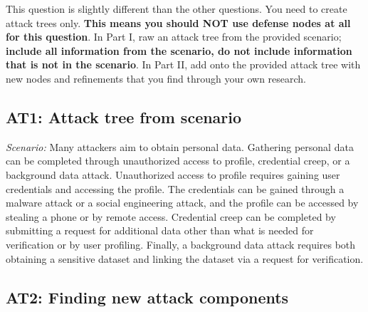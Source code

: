 

This question is slightly different than the other questions. You need to create attack trees only. \textbf{This means you should NOT use defense nodes at all for this question}. In Part I, raw an attack tree from the provided scenario; \textbf{include all information from the scenario, do not include information that is not in the scenario}. In Part II, add onto the provided attack tree with new nodes and refinements that you find through your own research.

\subsection*{AT1: Attack tree from scenario}

\emph{Scenario:}  Many attackers aim to obtain personal data. Gathering personal data can be completed through unauthorized access to profile, credential creep, or a background data attack. Unauthorized access to profile requires gaining user credentials and accessing the profile. The credentials can be gained through a malware attack or a social engineering attack, and the profile can be accessed by stealing a phone or by remote access. Credential creep can be completed by submitting a request for additional data other than what is needed for verification or by user profiling. Finally, a background data attack requires both obtaining a sensitive dataset and linking the dataset via a request for verification. 


\subsection*{AT2: Finding new attack components}

